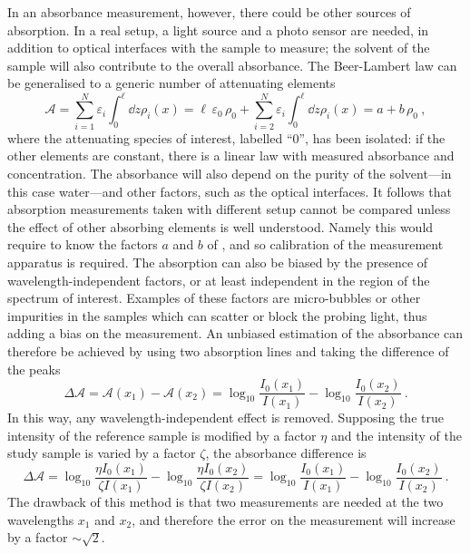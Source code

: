 In an absorbance measurement, however, there could be other sources of absorption.
In a real setup, a light source and a photo sensor are needed, in addition to optical interfaces with the %
sample to measure; the solvent of the sample will also contribute to the overall absorbance.
The Beer-Lambert law can be generalised to a generic number of attenuating elements
\begin{equation}
	\label{eq:linear_bl}
	\mathcal{A} = \sum_{i = 1}^N \varepsilon_i \int_0^\ell \dd{z} \rho_i (x) = %
	\ell\,\varepsilon_0\,\rho_0 +  \sum_{i = 2}^N \varepsilon_i \int_0^\ell \dd{z} \rho_i (x) = a + b \, \rho_0\ ,
\end{equation}
where the attenuating species of interest, labelled ``0'', has been isolated: %
if the other elements are constant, there is a linear law with measured absorbance and concentration.
The absorbance will also depend on the purity of the solvent---in this case water---and other factors, %
such as the optical interfaces.
It follows that absorption measurements taken with different setup cannot be compared unless the %
effect of other absorbing elements is well understood.
Namely this would require to know the factors $a$ and $b$ of , %
and so calibration of the measurement apparatus is required.
The absorption can also be biased by the presence of wavelength-independent factors, %
or at least independent in the region of the spectrum of interest.
Examples of these factors are micro-bubbles or other impurities in the samples which %
can scatter or block the probing light, thus adding a bias on the measurement.
An unbiased estimation of the absorbance can therefore be achieved by using two absorption lines %
and taking the difference of the peaks %
\begin{equation}
	\Delta \mathcal{A} = \mathcal{A}(x_1) - \mathcal{A}(x_2) = %
	\log_{10} \frac{I_0 (x_1)}{I(x_1)} - \log_{10} \frac{I_0 (x_2)}{I(x_2)}\ .
\end{equation}
In this way, any wavelength-independent effect is removed.
Supposing the true intensity of the reference sample is modified by a factor $\eta$ %
and the intensity of the study sample is varied by a factor $\zeta$, the absorbance difference is
\begin{equation}
	\Delta \mathcal{A} = %
	\log_{10} \frac{\eta I_0 (x_1)}{\zeta I(x_1)} - \log_{10} \frac{\eta I_0 (x_2)}{\zeta I(x_2)} = %
	\log_{10} \frac{I_0 (x_1)}{I(x_1)} - \log_{10} \frac{I_0 (x_2)}{I(x_2)}\ .
\end{equation}
The drawback of this method is that two measurements are needed at the two wavelengths $x_1$ and $x_2$, %
and therefore the error on the measurement will increase by a factor $\sim\sqrt{2}$.

